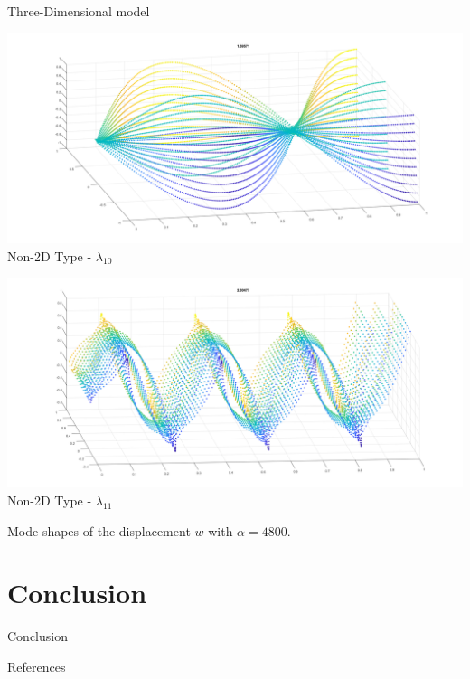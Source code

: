 \documentclass[8pt]{beamer}
\begin{document}
\begin{frame}{Three-Dimensional model}
            \begin{minipage}[b]{0.45\textwidth}
                \includegraphics[width=\textwidth]{3DNonBeam10.png}
                \\ Non-2D Type - $\lambda_{10}$
                \label{fig:minipage8}
            \end{minipage}
            \hfill
            \begin{minipage}[b]{0.45\textwidth}
                \includegraphics[width=\textwidth]{3DNonBeam11.png}
                \\ Non-2D Type - $\lambda_{11}$
                \label{fig:minipage7}
            \end{minipage}
        
            Mode shapes of the displacement \( w \) with \( \alpha = 4800 \).
        \end{frame}

\section{Conclusion}
    \begin{frame}{Conclusion}
    \end{frame}

    \begin{frame}{References}
        \printbibliography[heading=bibintoc, title={References}]
    \end{frame}
\end{document}
